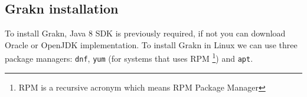 \begin{table}[H]
\label{fig:grakn-car}
\end{table}

\subsection{Grakn installation} %

To install Grakn, Java 8 SDK is previously required, if not you can download 
Oracle or OpenJDK implementation. To install Grakn in Linux we can use three 
package managers: \texttt{dnf}, \texttt{yum} (for systems that uses RPM
\footnote{RPM is a recursive acronym which means RPM Package Manager}) 
and \texttt{apt}.

